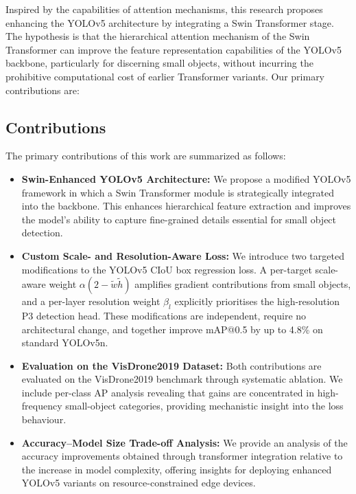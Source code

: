 \documentclass[conference]{IEEEtran}
\begin{document}
Inspired by the capabilities of attention mechanisms, this research proposes enhancing the YOLOv5 architecture by integrating a Swin Transformer stage. The hypothesis is that the hierarchical attention mechanism of the Swin Transformer can improve the feature representation capabilities of the YOLOv5 backbone, particularly for discerning small objects, without incurring the prohibitive computational cost of earlier Transformer variants. Our primary contributions are:

\subsection{Contributions}
The primary contributions of this work are summarized as follows:

\begin{itemize}
    \item \textbf{Swin-Enhanced YOLOv5 Architecture:} We propose a modified YOLOv5 framework in which a Swin Transformer module is strategically integrated into the backbone. This enhances hierarchical feature extraction and improves the model's ability to capture fine-grained details essential for small object detection.

    \item \textbf{Custom Scale- and Resolution-Aware Loss:} We introduce two targeted modifications to the YOLOv5 CIoU box regression loss. A per-target scale-aware weight $\alpha(2 - \tilde{w}\tilde{h})$ amplifies gradient contributions from small objects, and a per-layer resolution weight $\beta_l$ explicitly prioritises the high-resolution P3 detection head. These modifications are independent, require no architectural change, and together improve mAP@0.5 by up to 4.8\% on standard YOLOv5n.

    \item \textbf{Evaluation on the VisDrone2019 Dataset:} Both contributions are evaluated on the VisDrone2019 benchmark through systematic ablation. We include per-class AP analysis revealing that gains are concentrated in high-frequency small-object categories, providing mechanistic insight into the loss behaviour.

    \item \textbf{Accuracy--Model Size Trade-off Analysis:} We provide an analysis of the accuracy improvements obtained through transformer integration relative to the increase in model complexity, offering insights for deploying enhanced YOLOv5 variants on resource-constrained edge devices.
\end{itemize}
\end{document}
